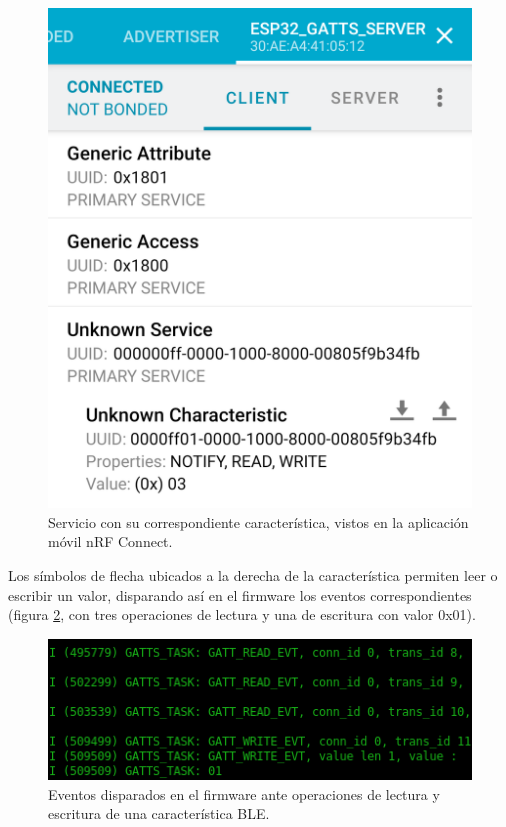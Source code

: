 \begin{figure}[h]
\centering
\includegraphics[scale=0.20]{./Figures/nrf_char_esp32.png}
\caption{Servicio con su correspondiente característica, vistos en la aplicación móvil nRF Connect.}
\label{fig:nrf_char_esp32}
\end{figure}

Los símbolos de flecha ubicados a la derecha de la característica permiten leer o escribir un valor, disparando así en el firmware los eventos correspondientes (figura \ref{fig:output_ble_event}, con tres operaciones de lectura y una de escritura con valor 0x01).

\begin{figure}[h]
\centering
\includegraphics[width=\textwidth]{./Figures/output_ble_event.png}
\caption{Eventos disparados en el firmware ante operaciones de lectura y escritura de una característica BLE.}
\label{fig:output_ble_event}
\end{figure}


